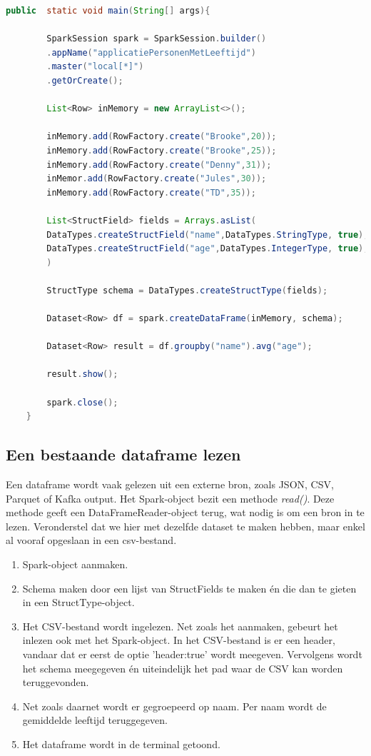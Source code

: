 \documentclass[a4paper,10pt,twoside]{report}
\begin{document}
\begin{lstlisting}[language=Java]
	public	static void main(String[] args){
		
		SparkSession spark = SparkSession.builder()
		.appName("applicatiePersonenMetLeeftijd")
		.master("local[*]")
		.getOrCreate();
		
		List<Row> inMemory = new ArrayList<>();
		
		inMemory.add(RowFactory.create("Brooke",20));
		inMemory.add(RowFactory.create("Brooke",25));
		inMemory.add(RowFactory.create("Denny",31));
		inMemor.add(RowFactory.create("Jules",30));
		inMemory.add(RowFactory.create("TD",35));
		
		List<StructField> fields = Arrays.asList(
		DataTypes.createStructField("name",DataTypes.StringType, true),
		DataTypes.createStructField("age",DataTypes.IntegerType, true);
		)
		
		StructType schema = DataTypes.createStructType(fields);
		
		Dataset<Row> df = spark.createDataFrame(inMemory, schema);
		
		Dataset<Row> result = df.groupby("name").avg("age");
		
		result.show();
		
		spark.close();
	}
\end{lstlisting}

\subsection{Een bestaande dataframe lezen}

Een dataframe wordt vaak gelezen uit een externe bron, zoals JSON, CSV, Parquet of Kafka output. Het Spark-object bezit een methode \textit{read()}. Deze methode geeft een DataFrameReader-object terug, wat nodig is om een bron in te lezen. Veronderstel dat we hier met dezelfde dataset te maken hebben, maar enkel al vooraf opgeslaan in een csv-bestand.

\begin{enumerate}
	\item Spark-object aanmaken.
	\item Schema maken door een lijst van StructFields te maken én die dan te gieten in een StructType-object.
	\item Het CSV-bestand wordt ingelezen. Net zoals het aanmaken, gebeurt het inlezen ook met het Spark-object. In het CSV-bestand is er een header, vandaar dat er eerst de optie 'header:true' wordt meegeven. Vervolgens wordt het schema meegegeven én uiteindelijk het pad waar de CSV kan worden teruggevonden.
	\item Net zoals daarnet wordt er gegroepeerd op naam. Per naam wordt de gemiddelde leeftijd teruggegeven.
	\item Het dataframe wordt in de terminal getoond.
\end{enumerate}
\end{document}
